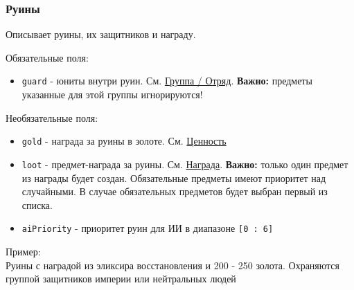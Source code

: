 \subsubsection{Руины}
\label{ruin}
Описывает руины, их защитников и награду.

Обязательные поля:
\begin{itemize}
\item \texttt{guard} - юниты внутри руин. См. \hyperref[group]{Группа / Отряд}. \textbf{Важно:} предметы указанные для этой группы игнорируются!
\end{itemize}

Необязательные поля:
\begin{itemize}
\item \texttt{gold} - награда за руины в золоте. См. \hyperref[value]{Ценность}
\item \texttt{loot} - предмет-награда за руины. См. \hyperref[loot]{Награда}. \textbf{Важно:} только один предмет из награды будет создан. Обязательные предметы имеют приоритет над случайными. В случае обязательных предметов будет выбран первый из списка.
\item \texttt{aiPriority} - приоритет руин для ИИ в диапазоне \texttt{[0 : 6]}
\end{itemize}

Пример:\\
Руины с наградой из эликсира восстановления и 200 - 250 золота.
Охраняются группой защитников империи или нейтральных людей

\begin{figure}[H]

\end{figure}